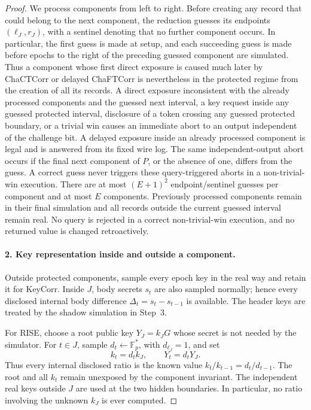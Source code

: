 \begin{proof}
We process components from left to right. Before creating any record that could belong to the next component, the reduction guesses its endpoints $(\ell_J,r_J)$, with a sentinel denoting that no further component occurs. In particular, the first guess is made at setup, and each succeeding guess is made before epochs to the right of the preceding guessed component are simulated. Thus a component whose first direct exposure is caused much later by ChaCTCorr or delayed ChaFTCorr is nevertheless in the protected regime from the creation of all its records. A direct exposure inconsistent with the already processed components and the guessed next interval, a key request inside any guessed protected interval, disclosure of a token crossing any guessed protected boundary, or a trivial win causes an immediate abort to an output independent of the challenge bit. A delayed exposure inside an already processed component is legal and is answered from its fixed wire log. The same independent-output abort occurs if the final next component of $P$, or the absence of one, differs from the guess. A correct guess never triggers these query-triggered aborts in a non-trivial-win execution. There are at most $(E+1)^2$ endpoint/sentinel guesses per component and at most $E$ components. Previously processed components remain in their final simulation and all records outside the current guessed interval remain real. No query is rejected in a correct non-trivial-win execution, and no returned value is changed retroactively.

\paragraph{2. Key representation inside and outside a component.}
Outside protected components, sample every epoch key in the real way and retain it for KeyCorr. Inside $J$, body secrets $s_t$ are also sampled normally; hence every disclosed internal body difference $\Delta_t=s_t-s_{t-1}$ is available. The header keys are treated by the shadow simulation in Step~3.

For RISE, choose a root public key $Y_J=k_JG$ whose secret is not needed by the simulator. For $t\in J$, sample $d_t\gets\mathbb F_p^*$, with $d_{\ell_J}=1$, and set
\[
 k_t=d_tk_J,\qquad Y_t=d_tY_J .
\]
Thus every internal disclosed ratio is the known value $k_t/k_{t-1}=d_t/d_{t-1}$. The root and all $k_t$ remain unexposed by the component invariant. The independent real keys outside $J$ are used at the two hidden boundaries. In particular, no ratio involving the unknown $k_J$ is ever computed.


\end{proof}
